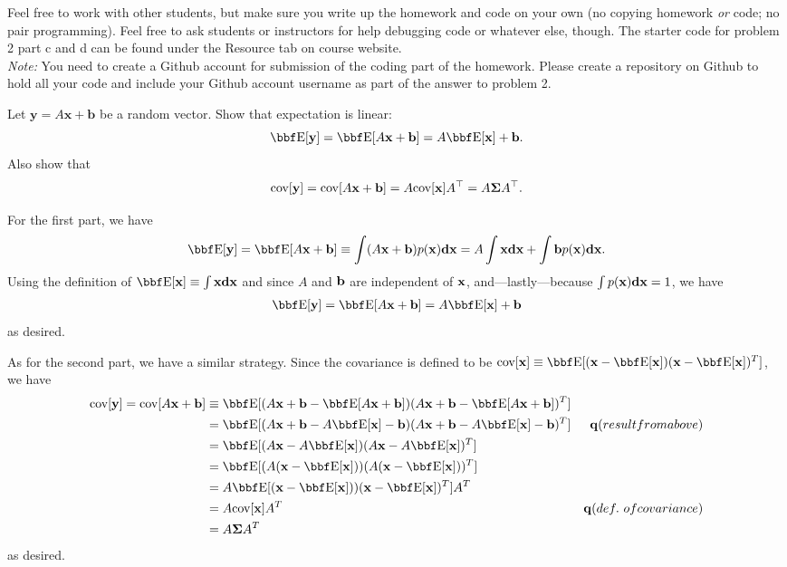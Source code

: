 \documentclass[12pt,letterpaper]{hmcpset}
\begin{document}
Feel free to work with other students, but make sure you write up the homework
and code on your own (no copying homework \textit{or} code; no pair programming).
Feel free to ask students or instructors for help debugging code or whatever else,
though.
The starter code for problem 2 part c and d can be found under the Resource tab on course website.\\

\textit{Note:} You need to create a Github account for submission of the coding part of the homework. Please create a repository on Github to hold all your code and include your Github account username as part of the answer to problem 2.

\begin{problem}
Let $\mathbf{y} = A\mathbf{x} + \mathbf{b}$ be a random vector.
Show that expectation is linear:
\[
    \EE[\yy] = \EE[A\xx + \bb] = A\EE[\xx] + \bb.
\]
Also show that
\[
    {\hbox{cov}}[{\bf y}] = {\hbox{cov}}[A{\bf x} + {\bf b}] = A {\hbox{cov}}[{\bf x}] A^\top = A\hbox{\boldmath$\Sigma$} A^\top.
\]
\end{problem}
\begin{solution}
    For the first part, we have 
    \begin{align*}
         \EE[\yy] = \EE[A\xx + \bb] \equiv \int (A \xx  + \bb) p(\xx) \dd{\xx} = A \int \xx \dd{\xx} + \int \bb p(\xx) \dd{\xx}.
    \end{align*}
    Using the definition of $\EE[\xx] \equiv \int \xx \dd{\xx}$ and since $A$ and ${\bf b}$ are independent of ${\bf x}$, and---lastly---because $\int p({\bf x}) {\bf d}{{\bf x}} = 1$, we have
    \begin{align*}
         \EE[\yy] = \EE[A\xx + \bb] = A\EE[\xx] + \bb
    \end{align*}
    as desired.

    As for the second part, we have a similar strategy. Since the covariance is defined to be  $\cov[\xx] \equiv \EE[(\xx - \EE[\xx])(\xx - \EE[\xx])^T]$, we have
    \begin{align*}
         \cov[\yy] = \cov[A\xx + \bb] &\equiv  \EE[(A\xx + \bb - \EE[A\xx + \bb])(A\xx + \bb - \EE[A\xx + \bb])^T] \\
         &= \EE[(A\xx + \bb - A\EE[\xx]  -\bb)(A\xx + \bb - A\EE[\xx]  -\bb)^T] &\qq{(result from above)} \\
         &=\EE[(A\xx - A\EE[\xx])(A\xx  - A\EE[\xx])^T] \\
         &= \EE[(A(\xx - \EE[\xx]))(A(\xx - \EE[\xx]))^T] \\
         &= A\EE[(\xx - \EE[\xx]))(\xx - \EE[\xx])^T] A^T \\
         &= A \cov[\xx] A^T &\qq{(def.\ of covariance)} \\
         &= A \Sigmab A^T
    \end{align*}
    as desired.
\end{solution}
\newpage
\end{document}
